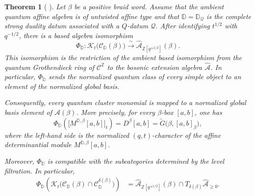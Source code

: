 \documentclass[12pt, reqno]{amsart}
\theoremstyle{plain}
\newtheorem{theorem}{Theorem}[section]
\theoremstyle{definition}
\numberwithin{equation}{section}
\newcommand{\ZZ}{\mathbb{Z}}
\newcommand{\DD}{\mathbb{D}}
\newcommand{\cA}{\mathcal{A}}
\begin{document}
\begin{theorem}[
{\cite[Theorems~6.2, 6.10 and~9.7]
{kashiwara2025monoidal}}]
\label{thm:isoKt}
Let \(\beta\) be a positive braid word. Assume that the ambient quantum
affine algebra is of untwisted affine type and that
\(\DD=\DD_{\mathcal Q}\) is the complete strong duality datum associated
with a \(Q\)-datum \(\mathcal Q\). After identifying \(t^{1/2}\) with
\(q^{-1/2}\), there is a based algebra isomorphism
\begin{equation}\label{eq:Kt-bosonic-isomorphism}
    \Phi_{\DD}\colon
    \mathcal{K}_t\bigl(\mathscr C_{\DD}(\beta)\bigr)
    \xrightarrow{\ \sim\ }
    \widehat{\cA}_{\ZZ[q^{\pm1/2}]}(\beta).
\end{equation}
This isomorphism is the restriction of the ambient based isomorphism
from the quantum Grothendieck ring of \(\mathscr C^{\ZZ}\) to the
bosonic extension algebra \(\widehat{\cA}\). In particular,
\(\Phi_{\DD}\) sends the normalized quantum class of every simple
object to an element of the normalized global basis.

Consequently, every quantum cluster monomial is mapped to a
normalized global basis element of \(\widehat{\cA}(\beta)\). More
precisely, for every \(\beta\)-box \([a,b]\), one has
\begin{equation}\label{eq:determinantial-module-minor}
    \Phi_{\DD}
    \left(
        \bigl[M^{\DD,\beta}[a,b]\bigr]_t
    \right)
    =
    D^\beta[a,b]
    =
    \widetilde G\bigl(\beta,[a,b]_\beta\bigr),
\end{equation}
where the left-hand side is the normalized \((q,t)\)-character of the
affine determinantial module \(M^{\DD,\beta}[a,b]\).

Moreover, \(\Phi_{\DD}\) is compatible with the subcategories
determined by the level filtration. In particular,
\begin{equation}\label{eq:interval-compatibility-Phi}
\begin{aligned}
    \Phi_{\DD}\!\left(
        \mathcal{K}_t\bigl(
            \mathscr C_{\DD}(\beta)
            \cap
            \mathscr C_{\DD}^{\delta(\beta)}
        \bigr)
    \right)
    &=
    \widehat{\cA}_{\ZZ[q^{\pm1/2}]}(\beta)
    \cap
    T_{\delta(\beta)}\widehat{\cA}_{\geq0}.
\end{aligned}
\end{equation}
\end{theorem}
\end{document}
